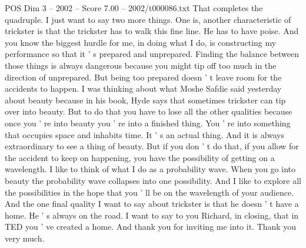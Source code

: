 \begin{textsample}{POS Dim 3 – 2002 – Score 7.00 – 2002/t000086.txt}
That completes the quadruple.
I just want to say two more things.
One is, another characteristic of trickster is that the trickster has to walk this fine line.
He has to have poise.
And you know the biggest hurdle for me, in doing what I do, is constructing my performance so that it ' s prepared and unprepared.
Finding the balance between those things is always dangerous because you might tip off too much in the direction of unprepared.
But being too prepared doesn ' t leave room for the accidents to happen.
I was thinking about what Moshe Safdie said yesterday about beauty because in his book, Hyde says that sometimes trickster can tip over into beauty.
But to do that you have to lose all the other qualities because once you ' re into beauty you ' re into a finished thing.
You ' re into something that occupies space and inhabits time.
It ' s an actual thing.
And it is always extraordinary to see a thing of beauty.
But if you don ' t do that, if you allow for the accident to keep on happening, you have the possibility of getting on a wavelength.
I like to think of what I do as a probability wave.
When you go into beauty the probability wave collapses into one possibility.
And I like to explore all the possibilities in the hope that you ' ll be on the wavelength of your audience.
And the one final quality I want to say about trickster is that he doesn ' t have a home.
He ' s always on the road.
I want to say to you Richard, in closing, that in TED you ' ve created a home.
And thank you for inviting me into it.
Thank you very much.

\end{textsample}
